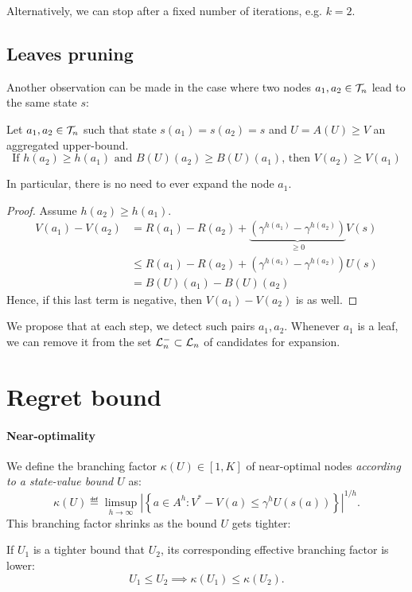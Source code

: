 \documentclass{article}
\begin{document}
Alternatively, we can stop after a fixed number of iterations, e.g. $k=2$.

\subsection{Leaves pruning}
\label{sec:pruning}

Another observation can be made in the case where two nodes $a_1,a_2\in\mathcal{T}_n$ lead to the same state $s$:
\begin{proposition}
\label{prop:pruning}
Let $a_1,a_2\in\mathcal{T}_n$ such that state $s(a_1) = s(a_2) = s$ and $U = A(U) \geq V$ an aggregated upper-bound. 
\begin{equation}
\label{eq:pruning}
    \text{If } h(a_2) \geq h(a_1) \text{ and } B(U)(a_2) \geq B(U)(a_1)
    \text{, then }V(a_2) \geq V(a_1)
\end{equation}

In particular, there is no need to ever expand the node $a_1$.
\end{proposition}
\begin{proof}
Assume $h(a_2) \geq h(a_1)$.
\begin{align*}
    V(a_1) - V(a_2) &= R(a_1)- R(a_2) + \underbrace{\left(\gamma^{h(a_1)} - \gamma^{h(a_2)}\right)}_{\geq 0}V(s) \\
    &\leq R(a_1)- R(a_2) + \left(\gamma^{h(a_1)} - \gamma^{h(a_2)}\right)U(s)\\
    &= B(U)(a_1) - B(U)(a_2)
\end{align*}
Hence, if this last term is negative, then $V(a_1) - V(a_2)$ is as well.
\end{proof}

We propose that at each step, we detect such pairs $a_1, a_2$. Whenever $a_1$ is a leaf, we can remove it from the set $\mathcal{L}_n^-\subset \mathcal{L}_n $ of candidates for expansion.

\section{Regret bound}

\paragraph{Near-optimality}

We define the branching factor $\kappa(U)\in[1, K]$ of near-optimal nodes \emph{according to a state-value bound $U$} as:
\begin{equation}
    \kappa(U) \eqdef \limsup_{h\rightarrow\infty} \left|\left\{a\in A^h: V^* - V(a)\leq \gamma^{h}U(s(a))\right\}\right|^{1/h}.
\end{equation}
This branching factor shrinks as the bound $U$ gets tighter:
\begin{lemma}
If $U_1$ is a tighter bound that $U_2$, its corresponding effective branching factor is lower:
\[U_1\leq U_2\implies \kappa(U_1) \leq \kappa(U_2).\]
\end{lemma}
\end{document}
